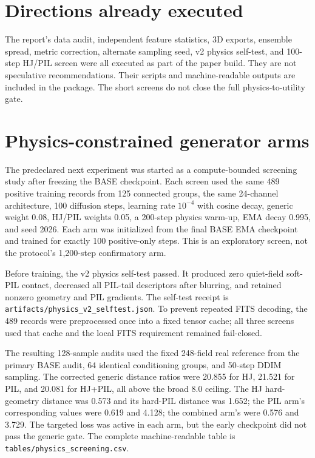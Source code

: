 \documentclass[11pt,oneside]{report}
\begin{document}
\section{Directions already executed}

The report’s data audit, independent feature statistics, 3D exports, ensemble spread, metric correction, alternate sampling seed, v2 physics self-test, and 100-step HJ/PIL screen were all executed as part of the paper build. They are not speculative recommendations. Their scripts and machine-readable outputs are included in the package. The short screens do not close the full physics-to-utility gate.

\section{Physics-constrained generator arms}

The predeclared next experiment was started as a compute-bounded screening study after freezing the BASE checkpoint. Each screen used the same 489 positive training records from 125 connected groups, the same 24-channel architecture, 100 diffusion steps, learning rate $10^{-4}$ with cosine decay, generic weight 0.08, HJ/PIL weights 0.05, a 200-step physics warm-up, EMA decay 0.995, and seed 2026. Each arm was initialized from the final BASE EMA checkpoint and trained for exactly 100 positive-only steps. This is an exploratory screen, not the protocol’s 1,200-step confirmatory arm.

Before training, the v2 physics self-test passed. It produced zero quiet-field soft-PIL contact, decreased all PIL-tail descriptors after blurring, and retained nonzero geometry and PIL gradients. The self-test receipt is \texttt{artifacts/physics\_v2\_selftest.json}. To prevent repeated FITS decoding, the 489 records were preprocessed once into a fixed tensor cache; all three screens used that cache and the local FITS requirement remained fail-closed.

The resulting 128-sample audits used the fixed 248-field real reference from the primary BASE audit, 64 identical conditioning groups, and 50-step DDIM sampling. The corrected generic distance ratios were 20.855 for HJ, 21.521 for PIL, and 20.081 for HJ+PIL, all above the broad 8.0 ceiling. The HJ hard-geometry distance was 0.573 and its hard-PIL distance was 1.652; the PIL arm’s corresponding values were 0.619 and 4.128; the combined arm’s were 0.576 and 3.729. The targeted loss was active in each arm, but the early checkpoint did not pass the generic gate. The complete machine-readable table is \texttt{tables/physics\_screening.csv}.
\end{document}
